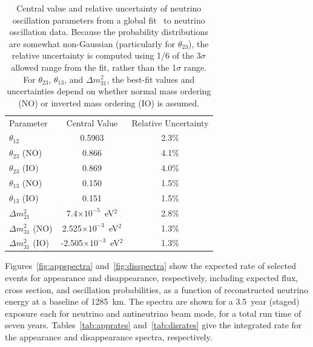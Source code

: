 \begin{table}[]
    \centering
    \begin{tabular}{lcc}
 Parameter &    Central Value & Relative Uncertainty \\
\toprowrule
$\theta_{12}$ & 0.5903 & 2.3\% \\ \colhline
$\theta_{23}$ (NO) & 0.866  & 4.1\% \\ 
$\theta_{23}$ (IO) & 0.869  & 4.0\% \\ \colhline
$\theta_{13}$ (NO) & 0.150  & 1.5\% \\ 
$\theta_{13}$ (IO) & 0.151  & 1.5\% \\ \colhline
$\Delta m^2_{21}$ & 7.4$\times10^{-5}$~eV$^2$ & 2.8\% \\ \colhline
$\Delta m^2_{31}$ (NO) & 2.525$\times10^{-3}$~eV$^2$ &  1.3\% \\
$\Delta m^2_{31}$ (IO) & -2.505$\times10^{-3}$~eV$^2$ &  1.3\% \\
    \end{tabular}
    \caption{Central value and relative uncertainty of neutrino oscillation parameters from a global fit~\cite{Esteban:2018azc,nufitweb} to neutrino oscillation data. Because the probability distributions are somewhat non-Gaussian (particularly for $\theta_{23}$), the relative uncertainty is computed using 1/6 of the 3$\sigma$ allowed range from the fit, rather than the 1$\sigma$ range.   For $\theta_{23}$, $\theta_{13}$, and $\Delta m^2_{31}$, the best-fit values and uncertainties depend on whether normal mass ordering (NO) or inverted mass ordering (IO) is assumed.}
    \label{tab:oscpar_nufit}
\end{table}

Figures~\ref{fig:appspectra} and~\ref{fig:disspectra} show the expected rate of selected events for \nue appearance and \numu disappearance, respectively, including expected flux, cross section, and oscillation probabilities, as a function of reconstructed neutrino energy at a baseline of
\num{1285}~km. The spectra are shown for a \num{3.5}~year (staged) exposure each for neutrino and antineutrino beam mode, for a total run time of seven %
years. Tables~\ref{tab:apprates} and~\ref{tab:disrates} give the integrated rate for the \nue %
appearance and \numu %
disappearance spectra, respectively.  

